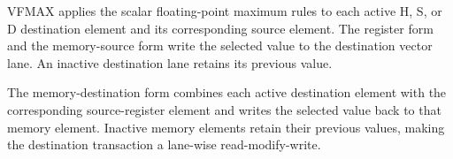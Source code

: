 VFMAX applies the scalar floating-point maximum rules to each active H, S, or
D destination element and its corresponding source element. The register form
and the memory-source form write the selected value to the destination vector
lane. An inactive destination lane retains its previous value.

The memory-destination form combines each active destination element with the
corresponding source-register element and writes the selected value back to
that memory element. Inactive memory elements retain their previous values,
making the destination transaction a lane-wise read-modify-write.
